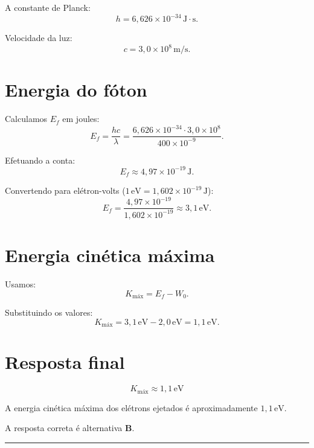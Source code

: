 \documentclass[a4paper,12pt]{article}
\begin{document}
\begin{flushleft}
A constante de Planck:
\[
h = 6{,}626 \times 10^{-34}\, \mathrm{J\cdot s}.
\]

Velocidade da luz:
\[
c = 3{,}0 \times 10^{8}\, \mathrm{m/s}.
\]

\section*{Energia do fóton}

Calculamos \(E_f\) em joules:
\[
E_f = \frac{hc}{\lambda} =
\frac{6{,}626 \times 10^{-34} \cdot 3{,}0 \times 10^{8}}{400 \times 10^{-9}}.
\]

Efetuando a conta:
\[
E_f \approx 4{,}97 \times 10^{-19}\, \mathrm{J}.
\]

Convertendo para elétron-volts (\(1\,\mathrm{eV} = 1{,}602 \times 10^{-19}\,\mathrm{J}\)):
\[
E_f = \frac{4{,}97 \times 10^{-19}}{1{,}602 \times 10^{-19}} \approx 3,1\,\mathrm{eV}.
\]

\section*{Energia cinética máxima}

Usamos:
\[
K_{\text{máx}} = E_f - W_0.
\]

Substituindo os valores:
\[
K_{\text{máx}} = 3{,}1\,\mathrm{eV} - 2{,}0\,\mathrm{eV} = 1{,}1\,\mathrm{eV}.
\]

\section*{Resposta final}

\[
\boxed{
K_{\text{máx}} \approx 1{,}1\,\mathrm{eV}
}
\]

A energia cinética máxima dos elétrons ejetados é aproximadamente \(1{,}1\,\mathrm{eV}\).

A resposta correta é alternativa \colorbox{green!50}{\textbf{B}}.
\end{flushleft}

\noindent\rule{\linewidth}{0.6pt}\\
\end{document}
